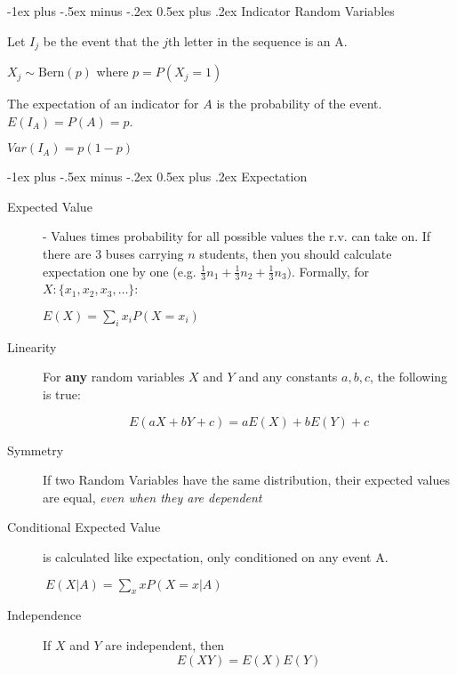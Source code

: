 \documentclass[10pt,landscape]{article}
\makeatletter
\theoremstyle{definition}
\newcommand{\Bern}{\textrm{Bern}}
\renewcommand{\section}{\@startsection{section}{1}{0mm}%
                                {-1ex plus -.5ex minus -.2ex}%
                                {0.5ex plus .2ex}%
                                {\normalfont\large\bfseries}}
\makeatother
\begin{document}
\begin{multicols}{3}
\section{Indicator Random Variables}

\begin{description}
\item Let $I_j$ be the event that the $j$th letter in the sequence is an A.
\item[Distribution] $X_j \sim \Bern(p)$ where $p = P(X_j = 1)$
\item[Fundamental Bridge] The expectation of an indicator for $A$ is the probability of the event. $E(I_A) = P(A)=p$. 
\item[Variance] $Var(I_A)=p(1-p)$
\end{description}

\section{Expectation}

\begin{description}
\item[Expected Value] - Values times probability for all possible values the r.v. can take on. If there are 3 buses carrying $n$ students, then you should calculate expectation one by one (e.g. $\frac{1}{3}n_1+\frac{1}{3}n_2+\frac{1}{3}n_3)$. Formally, for $X: \{x_1, x_2, x_3, \dots\}$:
\begin{center}
$E(X) = \sum\limits_{i}x_iP(X=x_i)$
\end{center}
\item[Linearity] For \textbf{any} random variables $X$ and $Y$ and any constants $a, b, c$, the following is true:

\[E(aX + bY + c) = aE(X) + bE(Y) + c \]

\item[Symmetry] If two Random Variables have the same distribution, their expected values are equal, \emph{even when they are dependent}
\item[Conditional Expected Value] is calculated like expectation, only conditioned on any event A. 
\begin{center}
$\ E(X | A) = \sum\limits_{x}xP(X=x | A)$

\end{center}
\item[Independence] If $X$ and $Y$ are independent, then
\[E(XY) = E(X)E(Y)\]
\end{description}

\end{multicols}
\end{document}
